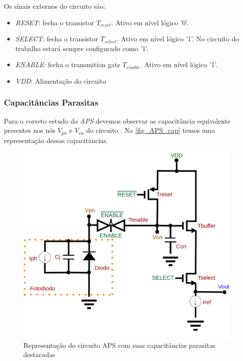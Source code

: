    Os sinais externos do circuito s\'ao:
    
\begin{itemize}
    \item \emph{RESET}: fecha o transistor \emph{$T_{reset}$}. Ativo em n\'ivel l\'ogico '0'.
     \item \emph{SELECT}: fecha o transistor \emph{$T_{select}$}. Ativo em n\'ivel l\'ogico '1'. No circuito do trabalho estar\'a sempre configurado como '1'.
     \item \emph{ENABLE}: fecha o transmition gate \emph{$T_{enable}$}. Ativo em n\'ivel l\'ogico '1'.
     \item \emph{VDD}: Alimenta{\c c}\~ao do circuito
\end{itemize}

\subsubsection{Capacit\^ancias Parasitas}
Para o correto estudo do \emph{APS} devemos observar as capacit\^ancia equivalente presentes nos n\'os \emph{$V_{pn}$} e \emph{$V_{cn}$} do circuito \cite{LidianeCampos}. Na \autoref{fig_APS_cap} temos uma representa{\c c}\~ao dessas capacit\^ancias.

\begin{figure}[htb]
	\caption{\label{fig_APS_cap}Representa{\c c}\~ao do circuito APS com suas capacit\^ancias parasitas destacadas}
	\begin{center}
	    \includegraphics[scale=0.3]{Circuitos/APS_cap.png}
	\end{center}
\end{figure}

